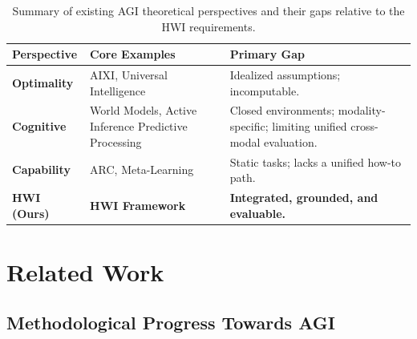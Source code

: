 \begin{table}[t] 
    \centering
    \caption{Summary of existing AGI theoretical perspectives and their gaps relative to the HWI requirements.}
    \vspace{-4mm}
    \label{tab:theory_summary}
    \renewcommand{\arraystretch}{1.0} 
    \setlength{\tabcolsep}{3pt} 
    \footnotesize 
    \begin{tabularx}{\columnwidth}{@{} p{1.3cm} p{2.7cm} X @{}}
        \toprule
        \textbf{Perspective} & \textbf{Core Examples} & \textbf{Primary Gap} \\ 
        \midrule
        \textbf{Optimality} & AIXI, Universal Intelligence & Idealized assumptions; incomputable. \\
        \midrule
        \textbf{Cognitive} & World Models, Active Inference Predictive Processing & Closed environments; modality-specific; limiting unified cross-modal evaluation. \\
        \midrule
        \textbf{Capability} & ARC, Meta-Learning & Static tasks; lacks a unified how-to path. \\
        \midrule
        \textbf{HWI (Ours)} & \textbf{HWI Framework} & \textbf{Integrated, grounded, and evaluable.} \\
        \bottomrule
    \end{tabularx}
    \vspace{-2mm} 
\end{table}

\section{Related Work}
\label{sec:related}

\subsection{Methodological Progress Towards AGI}

